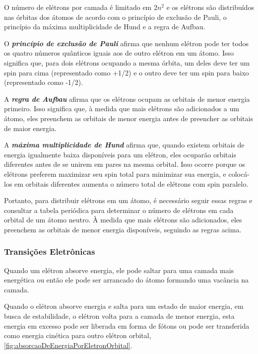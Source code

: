\documentclass[11pt,a4paper]{article}
\begin{document}
                O número de elétrons por camada é limitado em $2n^2$  e os elétrons são distribuídos nas órbitas dos átomos de acordo com o princípio de exclusão de Pauli, o princípio da máxima multiplicidade de Hund e a regra de Aufbau. 

                O \textbf{\textit{\textcolor{CarnationPink}{princípio de exclusão de Pauli}}} afirma que nenhum elétron pode ter todos os quatro números quânticos iguais aos de outro elétron em um átomo. Isso significa que, para dois elétrons ocupando a mesma órbita, um deles deve ter um spin para cima (representado como +1/2) e o outro deve ter um spin para baixo (representado como -1/2).

                A \textbf{\textit{\textcolor{CarnationPink}{regra de Aufbau}}} afirma que os elétrons ocupam as orbitais de menor energia primeiro. Isso significa que, à medida que mais elétrons são adicionados a um átomo, eles preenchem as orbitais de menor energia antes de preencher as orbitais de maior energia.

                A \textbf{\textit{\textcolor{CarnationPink}{máxima multiplicidade de Hund}}} afirma que, quando existem orbitais de energia igualmente baixa disponíveis para um elétron, eles ocuparão orbitais diferentes antes de se unirem em pares na mesma orbital. Isso ocorre porque os elétrons preferem maximizar seu spin total para minimizar sua energia, e colocá-los em orbitais diferentes aumenta o número total de elétrons com spin paralelo.

                Portanto, para distribuir elétrons em um átomo, é necessário seguir essas regras e consultar a tabela periódica para determinar o número de elétrons em cada orbital de um átomo neutro. À medida que mais elétrons são adicionados, eles preenchem as orbitais de menor energia disponíveis, seguindo as regras acima.


            \subsubsection{Transições Eletrônicas}

                Quando um elétron absorve energia, ele pode saltar para uma camada mais energética ou então ele pode ser arrancado do átomo formando uma vacância na camada. 
                
                Quando o elétron absorve energia e salta para um estado de maior energia, em busca de estabilidade, o elétron volta para a camada de menor energia, esta energia em excesso pode ser liberada em forma de fótons ou pode ser transferida como energia cinética para outro elétron orbital, \ref{fig:absorcaoDeEnergiaPorEletronOrbital}.
\end{document}
